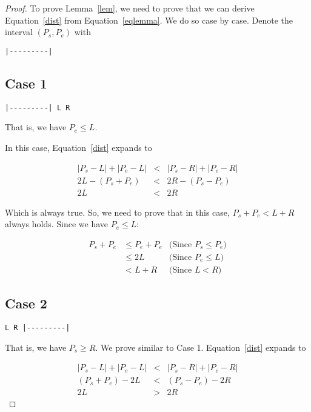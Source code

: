 \documentclass[a4paper]{article}
\begin{document}
\begin{proof}

To prove Lemma~\ref{lem}, we need to prove that we can derive
Equation~\ref{dist} from Equation~\ref{eqlemma}. We do so case by case.
Denote the interval $(P_s, P_e)$ with

\begin{verbatim}
|---------|
\end{verbatim}

\subsection{Case 1}

\begin{verbatim}
|---------| L R
\end{verbatim}

That is, we have $P_e \le L$.

In this case, Equation~\ref{dist} expands to

\begin{eqnarray*}
  |P_s - L| + |P_e - L| &<& |P_s - R| + |P_e - R| \\
  2L - (P_s + P_e) &<& 2R - (P_s - P_e) \\
  2L &<& 2R
\end{eqnarray*}

Which is always true. So, we need to prove that in this case,
$P_s + P_e < L+R$ always holds. Since we have $P_e \le L$:

\begin{eqnarray*}
  P_s + P_e &\le P_e + P_e & \text{(Since $P_s \le P_e$)} \\
            &\le 2L & \text{(Since $P_e \le L$)} \\
            &< L + R & \text{(Since $L < R$)}
\end{eqnarray*}

\subsection{Case 2}

\begin{verbatim}
L R |---------|
\end{verbatim}

That is, we have $P_s \ge R$. We prove similar to Case 1.
Equation~\ref{dist} expands to

\begin{eqnarray*}
  |P_s - L| + |P_e - L| &<& |P_s - R| + |P_e - R| \\
  (P_s + P_e) - 2L &<& (P_s - P_e) - 2R\\
  2L &>& 2R
\end{eqnarray*}


\end{proof}
\end{document}
